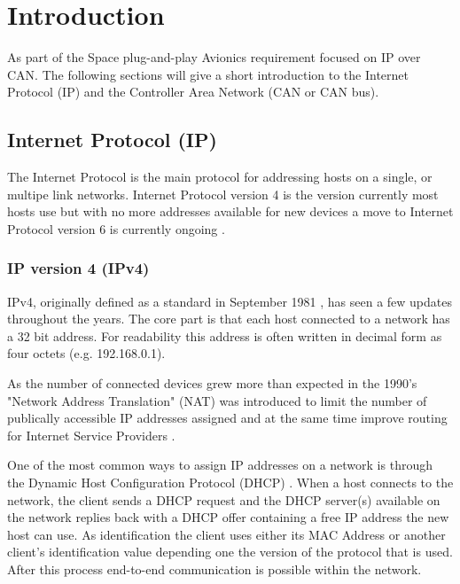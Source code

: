 \section{Introduction}\label{sec:introduction}
As part of the Space plug-and-play Avionics requirement
focused on IP over CAN. The following sections will give a short
introduction to the Internet Protocol (IP) and the Controller Area Network
(CAN or CAN bus).

\subsection{Internet Protocol (IP)}
The Internet Protocol is the main protocol for addressing hosts on a
single, or multipe link networks. Internet Protocol version 4 is the
version currently most hosts use but with no more addresses available
for new devices a move to Internet Protocol version 6 is currently ongoing
\cite{web:rfc6540}.

\subsubsection{IP version 4 (IPv4)}\label{introduction:ipv4}
IPv4, originally defined as a standard in September 1981 \cite{web:rfc791}, has
seen a few updates throughout the years. The core part is that each host
connected to a network has a 32 bit address. For readability this address
is often written in decimal form as four octets (e.g. 192.168.0.1).

As the number of connected devices grew more than expected in the 1990's
"Network Address Translation" (NAT) was introduced to limit the number of
publically accessible IP addresses assigned and at the same time improve routing for Internet
Service Providers \cite{web:rfc1631, web:rfc1918, web:rfc3022}.

One of the most common ways to assign IP addresses on a network is through the
Dynamic Host Configuration Protocol (DHCP) \cite{web:rfc2131, web:rfc2132, web:rfc4361}.
When a host connects to the network, the client sends a DHCP request and the DHCP
server(s) available on the network replies back with a DHCP offer containing a free
IP address the new host can use. As identification the client uses either its
MAC Address or another client's identification value depending one the version of the
protocol that is used. After this process end-to-end communication is possible
within the network.


